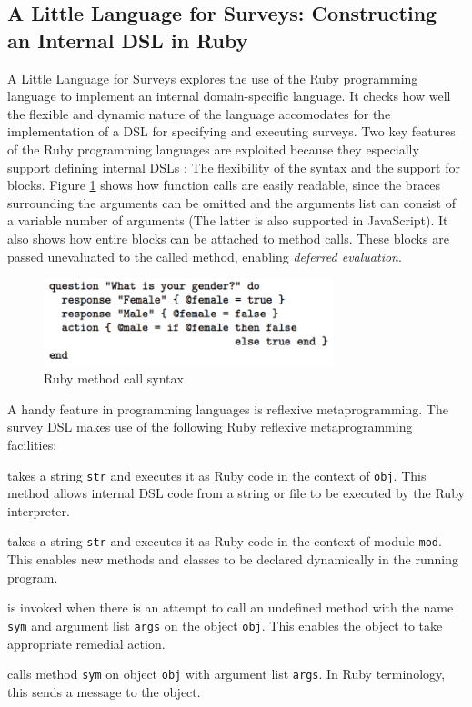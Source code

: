 \subsection{A Little Language for Surveys: Constructing an Internal DSL in Ruby}
A Little Language for Surveys \cite{RubyDSL} explores the use of the Ruby programming language to implement an internal domain-specific language. It checks how well the flexible and dynamic nature of the language accomodates for the implementation of a DSL for specifying and executing surveys. Two key features of the Ruby programming languages are exploited because they especially support defining internal DSLs : The flexibility of the syntax\cite{RubyFlexibleSupport} and the support for blocks\cite{RubyBlockSupport}. Figure \ref{fig:RubySyntax} shows how function calls are easily readable, since the braces surrounding the arguments can be omitted and the arguments list can consist of a variable number of arguments (The latter is also supported in JavaScript\cite{Ecma6}). It also shows how entire blocks can be attached to method calls. These blocks are passed unevaluated to the called method, enabling \textit{deferred evaluation}.

\begin{figure}[!ht]
  	\centering
    	\includegraphics[width=0.75\textwidth]{images/RubySyntax} 
    	\caption{Ruby method call syntax}
    \label{fig:RubySyntax}
\end{figure}

A handy feature in programming languages is reflexive metaprogramming. The survey DSL makes use of the following Ruby reflexive metaprogramming facilities:

\begin{description}[align=left]

\item [obj.instance\_eval(str)] takes a string \texttt{str} and executes it as Ruby code in the context of \texttt{obj}. This method allows internal DSL code from a string or file to be executed by the Ruby interpreter.

\item [mod.class\_eval(str)] takes a string \texttt{str} and executes it as Ruby code in the context of module \texttt{mod}. This enables new methods and classes to be declared dynamically in the running program.
\item [obj.method\_missing(sym, *args)] is invoked when there is an attempt to call an undefined method with the name \texttt{sym} and argument list \texttt{args} on the object \texttt{obj}. This enables the object to take appropriate remedial action.
\item [obj.send(sym, *args)] calls method \texttt{sym} on object \texttt{obj} with argument list \texttt{args}. In Ruby terminology, this sends a message to the object.
\end{description}

